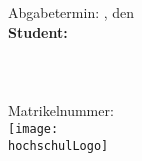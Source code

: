 \begin{titlepage}

\begin{center}

\Large{\studiengang}\\
\LARGE{\betreff}\\[4ex]

\huge{\textbf{\titel}}\\[1.5ex]
\Large{\textbf{\untertitel}}\\[4ex]

\normalsize
Abgabetermin: \abgabeOrt, den \abgabeTermin\\[3em]
\textbf{Student:}\\
\autorName\\
\autorAnschrift\\
\autorOrt\\
Matrikelnummer: \autorMatrikelnummer\\[5ex]


\texttt{[image: \\hochschulLogo]}\\[2ex]
\betriebName\\
\pruefer\\
\betriebAnschrift\\
\betriebOrt\\[5em]

\end{center}


\end{titlepage}